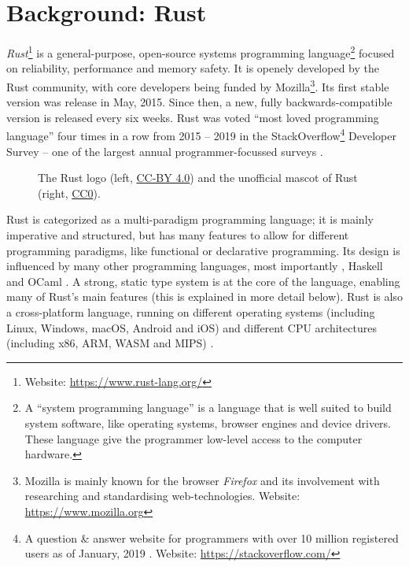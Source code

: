 \chapter{Background: Rust}

\emph{Rust}\footnote{Website: \url{https://www.rust-lang.org/}} is a general-purpose, open-source systems programming language\footnote{A \enquote{system programming language} is a language that is well suited to build system software, like operating systems, browser engines and device drivers. These language give the programmer low-level access to the computer hardware.} focused on reliability, performance and memory safety.
It is openely developed by the Rust community, with core developers being funded by Mozilla\footnote{Mozilla is mainly known for the browser \emph{Firefox} and its involvement with researching and standardising web-technologies. Website: \url{https://www.mozilla.org}}.
Its first stable version was release in May, 2015.
Since then, a new, fully backwards-compatible version is released every six weeks.
Rust was voted \enquote{most loved programming language} four times in a row from 2015 -- 2019 in the StackOverflow\footnote{A question \& answer website for programmers with over 10 million registered users as of January, 2019 \cite{so-user-count}. Website: \url{https://stackoverflow.com/}} Developer Survey -- one of the largest annual programmer-focussed surveys \cite{so-survey}.

\begin{figure}[h]
  \vspace{5mm}
  \centering
  
  \caption{The Rust logo (left, \protect\hyperlink{cc-by}{CC-BY 4.0}) and the unofficial mascot of Rust (right, \protect\hyperlink{cc0}{CC0}).}
  \vspace{5mm}
\end{figure}

Rust is categorized as a multi-paradigm programming language; it is mainly imperative and structured, but has many features to allow for different programming paradigms, like functional or declarative programming.
Its design is influenced by many other programming languages, most importantly \cpp, Haskell and OCaml \cite{rust-influences}.
A strong, static type system is at the core of the language, enabling many of Rust's main features (this is explained in more detail below).
Rust is also a cross-platform language, running on different operating systems (including Linux, Windows, macOS, Android and iOS) and different CPU architectures (including x86, ARM, WASM and MIPS) \cite{rust-platforms}.

